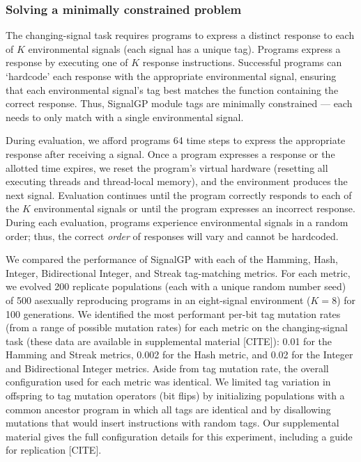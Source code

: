 
\subsubsection{Solving a minimally constrained problem}

The changing-signal task requires programs to express a distinct response to each of $K$ environmental signals (each signal has a unique tag).
Programs express a response by executing one of $K$ response instructions.
Successful programs can `hardcode' each response with the appropriate environmental signal, ensuring that each environmental signal's tag best matches the function containing the correct response.
Thus, SignalGP module tags are minimally constrained --- each needs to only match with a single environmental signal.

During evaluation, we afford programs 64 time steps to express the appropriate response after receiving a signal.
Once a program expresses a response or the allotted time expires, we reset the program's virtual hardware (resetting all executing threads and thread-local memory), and the environment produces the next signal.
Evaluation continues until the program correctly responds to each of the $K$ environmental signals or until the program expresses an incorrect response.
During each evaluation, programs experience environmental signals in a random order; thus, the correct \textit{order} of responses will vary and cannot be hardcoded.

We compared the performance of SignalGP with each of the Hamming, Hash, Integer, Bidirectional Integer, and Streak tag-matching metrics.
For each metric, we evolved 200 replicate populations (each with a unique random number seed) of 500 asexually reproducing programs in an eight-signal environment ($K=8$) for 100 generations.
We identified the most performant per-bit tag mutation rates (from a range of possible mutation rates) for each metric on the changing-signal task (these data are available in supplemental material [CITE]): 0.01 for the Hamming and Streak metrics, 0.002 for the Hash metric, and 0.02 for the Integer and Bidirectional Integer metrics.
Aside from tag mutation rate, the overall configuration used for each metric was identical.
We limited tag variation in offspring to tag mutation operators (bit flips) by initializing populations with a common ancestor program in which all tags are identical and by disallowing mutations that would insert instructions with random tags.
Our supplemental material gives the full configuration details for this experiment, including a guide for replication [CITE].

